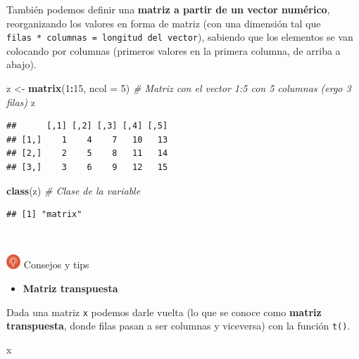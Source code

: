 \documentclass[11pt,]{book}
\newenvironment{Shaded}{\begin{snugshade}}{\end{snugshade}}
\newcommand{\CommentTok}[1]{\textcolor[rgb]{0.37,0.37,0.37}{\textit{#1}}}
\newcommand{\DataTypeTok}[1]{\textcolor[rgb]{0.27,0.27,0.27}{#1}}
\newcommand{\DecValTok}[1]{\textcolor[rgb]{0.06,0.06,0.06}{#1}}
\newcommand{\KeywordTok}[1]{\textcolor[rgb]{0.27,0.27,0.27}{\textbf{#1}}}
\newcommand{\NormalTok}[1]{#1}
\newcommand{\OperatorTok}[1]{\textcolor[rgb]{0.43,0.43,0.43}{\textbf{#1}}}
\newcommand{\StringTok}[1]{\textcolor[rgb]{0.5,0.5,0.5}{#1}}
\providecommand{\tightlist}{%
  \setlength{\itemsep}{0pt}\setlength{\parskip}{0pt}}
\begin{document}
También podemos definir una \textbf{matriz a partir de un vector numérico}, reorganizando los valores en forma de matriz (con una dimensión tal que \texttt{filas\ *\ columnas\ =\ longitud\ del\ vector}), sabiendo que los elementos se van colocando por columnas (primeros valores en la primera columna, de arriba a abajo).

\begin{Shaded}
\begin{Highlighting}[]
\NormalTok{z <-}\StringTok{ }\KeywordTok{matrix}\NormalTok{(}\DecValTok{1}\OperatorTok{:}\DecValTok{15}\NormalTok{, }\DataTypeTok{ncol =} \DecValTok{5}\NormalTok{) }\CommentTok{# Matriz con el vector 1:5 con 5 columnas (ergo 3 filas)}
\NormalTok{z}
\end{Highlighting}
\end{Shaded}

\begin{verbatim}
##      [,1] [,2] [,3] [,4] [,5]
## [1,]    1    4    7   10   13
## [2,]    2    5    8   11   14
## [3,]    3    6    9   12   15
\end{verbatim}

\begin{Shaded}
\begin{Highlighting}[]
\KeywordTok{class}\NormalTok{(z) }\CommentTok{# Clase de la variable}
\end{Highlighting}
\end{Shaded}

\begin{verbatim}
## [1] "matrix"
\end{verbatim}

~

\includegraphics[width=0.04\textwidth,height=\textheight]{img/logo_info.png} Consejos y tips

\begin{itemize}
\tightlist
\item
  \textbf{Matriz transpuesta}
\end{itemize}

Dada una matriz \texttt{x} podemos darle vuelta (lo que se conoce como \textbf{matriz transpuesta}, donde filas pasan a ser columnas y viceversa) con la función \texttt{t()}.

\begin{Shaded}
\begin{Highlighting}[]
\NormalTok{x}
\end{Highlighting}
\end{Shaded}
\end{document}
